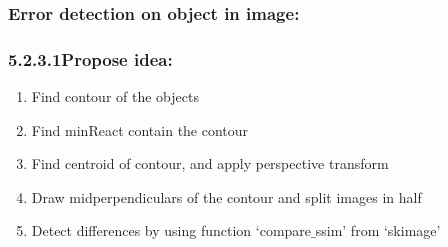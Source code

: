 \subsubsection{Error detection on object in image:}
\subsubsection*{5.2.3.1\hspace{0.5cm}Propose idea:}
\begin{enumerate}
\item Find contour of the objects
\item Find minReact contain the contour
\item Find centroid of contour, and apply perspective transform
\item Draw midperpendiculars of the contour and split images in half
\item Detect differences by using function `compare$\_$ssim' from `skimage'
\end{enumerate}
\pagebreak
